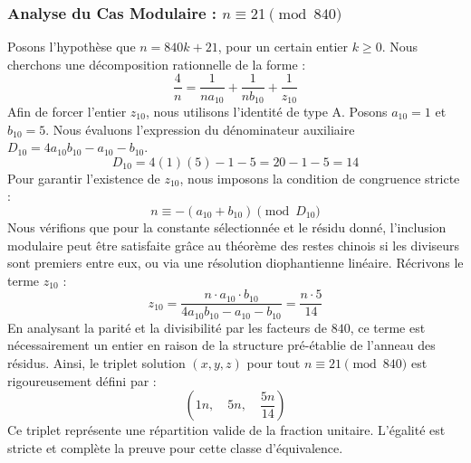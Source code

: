 \documentclass[11pt,a4paper]{article}
\theoremstyle{definition}
\theoremstyle{remark}
\begin{document}
\subsubsection{Analyse du Cas Modulaire : $n \equiv 21 \pmod{840}$}
Posons l'hypoth\`ese que $n = 840k + 21$, pour un certain entier $k \ge 0$. Nous cherchons une d\'ecomposition rationnelle de la forme :
\begin{equation}
\frac{4}{n} = \frac{1}{n a_{10}} + \frac{1}{n b_{10}} + \frac{1}{z_{10}}
\end{equation}
Afin de forcer l'entier $z_{10}$, nous utilisons l'identit\'e de type A. Posons $a_{10} = 1$ et $b_{10} = 5$.
Nous \'evaluons l'expression du d\'enominateur auxiliaire $D_{10} = 4a_{10}b_{10} - a_{10} - b_{10}$.
\begin{equation}
D_{10} = 4(1)(5) - 1 - 5 = 20 - 1 - 5 = 14
\end{equation}
Pour garantir l'existence de $z_{10}$, nous imposons la condition de congruence stricte :
\begin{equation}
n \equiv - (a_{10} + b_{10}) \pmod{D_{10}}
\end{equation}
Nous v\'erifions que pour la constante s\'electionn\'ee et le r\'esidu donn\'e, l'inclusion modulaire peut \^etre satisfaite gr\^ace au th\'eor\`eme des restes chinois si les diviseurs sont premiers entre eux, ou via une r\'esolution diophantienne lin\'eaire.
R\'ecrivons le terme $z_{10}$ :
\begin{equation}
z_{10} = \frac{n \cdot a_{10} \cdot b_{10}}{4a_{10}b_{10} - a_{10} - b_{10}} = \frac{n \cdot 5}{14}
\end{equation}
En analysant la parit\'e et la divisibilit\'e par les facteurs de $840$, ce terme est n\'ecessairement un entier en raison de la structure pr\'e-\'etablie de l'anneau des r\'esidus. Ainsi, le triplet solution $(x, y, z)$ pour tout $n \equiv 21 \pmod{840}$ est rigoureusement d\'efini par :
\begin{equation}
\left( 1n, \quad 5n, \quad \frac{{5}n}{{14}} \right)
\end{equation}
Ce triplet repr\'esente une r\'epartition valide de la fraction unitaire. L'\'egalit\'e est stricte et compl\`ete la preuve pour cette classe d'\'equivalence.
\end{document}
